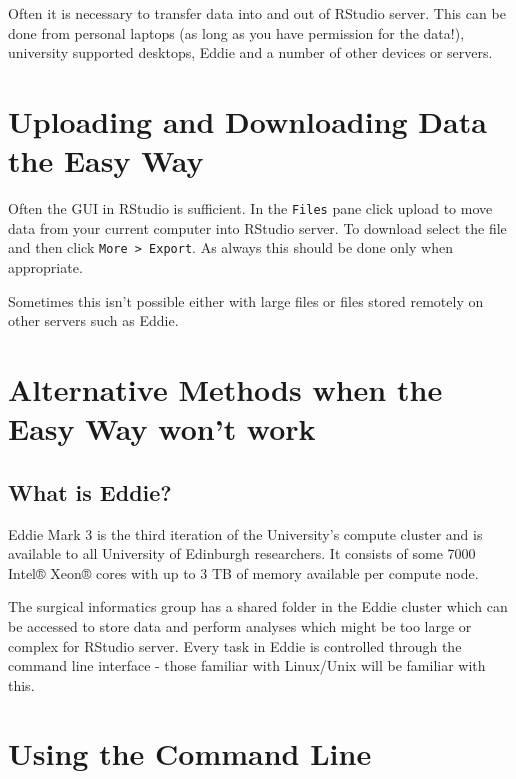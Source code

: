 \documentclass[]{book}
\begin{document}
Often it is necessary to transfer data into and out of RStudio server. This can be done from personal laptops (as long as you have permission for the data!), university supported desktops, Eddie and a number of other devices or servers.

\hypertarget{uploading-and-downloading-data-the-easy-way}{%
\section{Uploading and Downloading Data the Easy Way}\label{uploading-and-downloading-data-the-easy-way}}

Often the GUI in RStudio is sufficient. In the \texttt{Files} pane click upload to move data from your current computer into RStudio server. To download select the file and then click \texttt{More\ \textgreater{}\ Export}. As always this should be done only when appropriate.

Sometimes this isn't possible either with large files or files stored remotely on other servers such as Eddie.

\hypertarget{alternative-methods-when-the-easy-way-wont-work}{%
\section{Alternative Methods when the Easy Way won't work}\label{alternative-methods-when-the-easy-way-wont-work}}

\hypertarget{what-is-eddie}{%
\subsection{What is Eddie?}\label{what-is-eddie}}

Eddie Mark 3 is the third iteration of the University's compute cluster and is available to all University of Edinburgh researchers. It consists of some 7000 Intel® Xeon® cores with up to 3 TB of memory available per compute node.

The surgical informatics group has a shared folder in the Eddie cluster which can be accessed to store data and perform analyses which might be too large or complex for RStudio server. Every task in Eddie is controlled through the command line interface - those familiar with Linux/Unix will be familiar with this.

\hypertarget{using-the-command-line}{%
\section{Using the Command Line}\label{using-the-command-line}}
\end{document}
